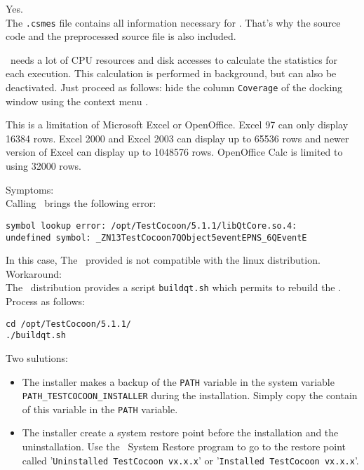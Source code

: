 Yes.\\
The \verb$.csmes$ file contains all information necessary for \CoverageBrowser.
That's why the source code and the preprocessed source file is also included.

\chapterHTMLnonu{\CoverageBrowser}


\CoverageBrowser\ needs a lot of CPU resources and disk accesses to calculate the statistics for each execution.
This calculation is performed in background, but can also be deactivated.
Just proceed as follows:
 hide the column \verb$Coverage$ of the docking window  using the context menu .


This is a limitation of Microsoft Excel or OpenOffice.
Excel 97 can only display 16384 rows. Excel 2000 and Excel 2003 can display up to 65536 rows and newer version of Excel can display up to 1048576 rows. OpenOffice Calc is limited to using 32000 rows.



Symptoms:\\
Calling \CoverageBrowser\ brings the following error:
\begin{verbatim}
symbol lookup error: /opt/TestCocoon/5.1.1/libQtCore.so.4: 
undefined symbol: _ZN13TestCocoon7QObject5eventEPNS_6QEventE
\end{verbatim}
In this case, The \QtLibrary\ provided is not compatible with the linux distribution.
Workaround:\\
The \TestCocoon\ distribution provides a script \verb$buildqt.sh$ which permits to rebuild the \QtLibrary.
Process as follows:\\
\begin{verbatim}
cd /opt/TestCocoon/5.1.1/
./buildqt.sh
\end{verbatim}


Two sulutions:
\begin{itemize}
\item The installer makes a backup of the \verb$PATH$ variable in the system variable \verb$PATH_TESTCOCOON_INSTALLER$ during the installation.
Simply copy the contain of this variable in the \verb$PATH$ variable.
\item The installer create a system restore point before the installation and the uninstallation. Use the \MicrosoftWindows\ System Restore program to go to the restore point called '\verb$Uninstalled TestCocoon vx.x.x$' or '\verb$Installed TestCocoon vx.x.x$'.
\end{itemize}

